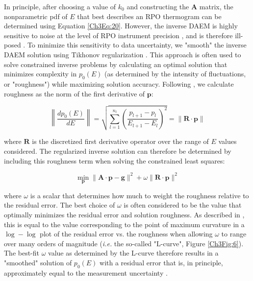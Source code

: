 In principle, after choosing a value of $k_{0}$ and constructing the $\mathbf{A}$ matrix, the nonparametric pdf of $E$ that best describes an RPO thermogram can be determined using Equation \ref{Ch3Eq:20}. However, the inverse DAEM is highly sensitive to noise at the level of RPO instrument precision \citep[\textit{i.e.} approximately $\pm 5$ ppm, $\pm 5$\textdegree\ C;][]{Hemingway:2016rc}, and is therefore ill-posed \citep{Hansen:1994uc}. To minimize this sensitivity to data uncertainty, we "smooth" the inverse DAEM solution using Tikhonov regularization \citep{Tikhonov:1977ui,Hansen:1994uc,Forney:2012dr,Forney:2012hz}. This approach is often used to solve constrained inverse problems by calculating an optimal solution that minimizes complexity in $p_{0}(E)$ (as determined by the intensity of fluctuations, or "roughness") while maximizing solution accuracy. Following \citet{Forney:2012hz}, we calculate roughness as the norm of the first derivative of $\mathbf{p}$:

\begin{equation}\label{Ch3Eq:22}
	\left\| \frac{d p_{0}(E)}{dE} \right\| = \sqrt{ \sum_{l=1}^{n_{l}}\left( \frac{p_{l+1} - p_{l}}{E_{l+1} - E_{l}}\right)^{2}} = \| \mathbf{R} \cdot \mathbf{p} \| 
\end{equation}

where $\mathbf{R}$ is the discretized first derivative operator over the range of $E$ values considered. The regularized inverse solution can therefore be determined by including this roughness term when solving the constrained least squares:

\begin{equation}\label{Ch3Eq:23}
	\min_{\mathbf{p}} \| \mathbf{A} \cdot \mathbf{p} - \mathbf{g} \|^{2} + \omega \| \mathbf{R} \cdot \mathbf{p} \|^{2}
\end{equation}

where $\omega$ is a scalar that determines how much to weight the roughness relative to the residual error. The best choice of $\omega$ is often considered to be the value that optimally minimizes the residual error and solution roughness. As described in \citet{Hansen:1994uc}, this is equal to the value corresponding to the point of maximum curvature in a $\log-\log$ plot of the residual error vs. the roughness when allowing $\omega$ to range over many orders of magnitude (\textit{i.e.} the so-called "L-curve", Figure \ref{Ch3Fig:6}). The best-fit $\omega$ value as determined by the L-curve therefore results in a "smoothed" solution of $p_{0}(E)$ with a residual error that is, in principle, approximately equal to the measurement uncertainty \citep{Forney:2012hz}. 

